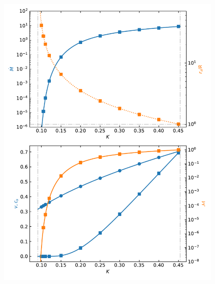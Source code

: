 \documentclass[preprint,12pt]{aastex}
\begin{document}
\begin{figure}
\begin{center}
	\includegraphics[width=13.5cm]{plot_gam11.pdf}
\end{center}
\end{figure}
\end{document}
